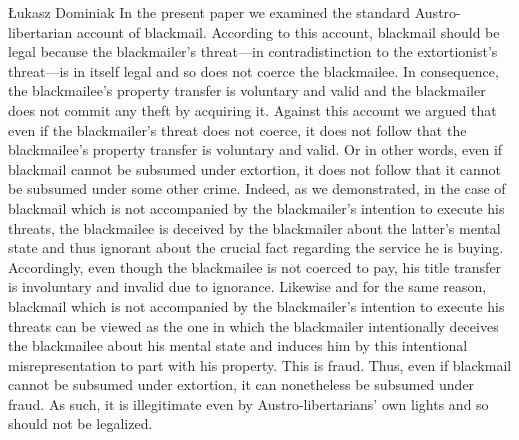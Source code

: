 \begin{artengenv}{Łukasz Dominiak}
In the present paper we examined the standard Austro-libertarian account of blackmail. According to this account, blackmail should be legal because the blackmailer's threat---in contradistinction to the extortionist's threat---is in itself legal and so does not coerce the blackmailee. In consequence, the blackmailee's property transfer is voluntary and valid and the blackmailer does not commit any theft by acquiring it. Against this account we argued that even if the blackmailer's threat does not coerce, it does not follow that the blackmailee's property transfer is voluntary and valid. Or in other words, even if blackmail cannot be subsumed under extortion, it does not follow that it cannot be subsumed under some other crime. Indeed, as we demonstrated, in the case of blackmail which is not accompanied by the blackmailer's intention to execute his threats, the blackmailee is deceived by the blackmailer about the latter's mental state and thus ignorant about the crucial fact regarding the service he is buying. Accordingly, even though the blackmailee is not coerced to pay, his title transfer is involuntary and invalid due to ignorance. Likewise and for the same reason, blackmail which is not accompanied by the blackmailer's intention to execute his threats can be viewed as the one in which the blackmailer intentionally deceives the blackmailee about his mental state and induces him by this intentional misrepresentation to part with his property. This is fraud. Thus, even if blackmail cannot be subsumed under extortion, it can nonetheless be subsumed under fraud. As such, it is illegitimate even by Austro-libertarians' own lights and so should not be legalized.



\end{artengenv}

\label{dominiak-last}
